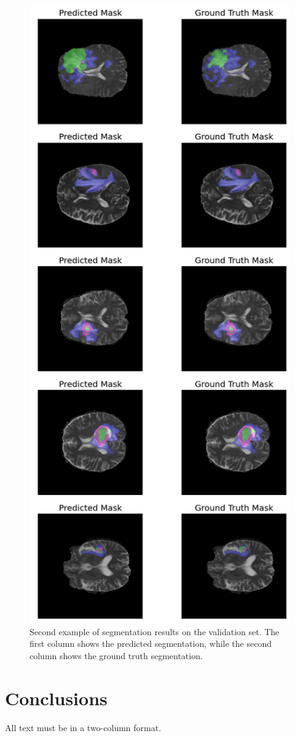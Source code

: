 \documentclass[10pt,twocolumn,letterpaper]{article}
\begin{document}
\begin{figure} 
\centering
\includegraphics[width=0.8\linewidth]{img/row-2-column-1.png}
\caption{Second example of segmentation results on the validation set. The first column shows the predicted segmentation, while the second column shows the ground truth segmentation.}
\label{fig:row-2-column-1}
\end{figure}
\section{Conclusions}

All text must be in a two-column format. 


{\small


}
\end{document}
